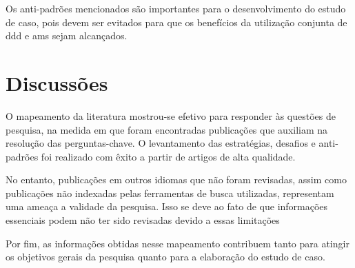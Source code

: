Os anti-padrões mencionados são importantes para o desenvolvimento do estudo de caso, pois devem ser evitados para que os benefícios da utilização conjunta de \acrshort{ddd} e \acrshort{ams} sejam alcançados.

\section{Discussões}
O mapeamento da literatura mostrou-se efetivo para responder às questões de pesquisa, na medida em que foram encontradas publicações que auxiliam na resolução das perguntas-chave. O levantamento das estratégias, desafios e anti-padrões foi realizado com êxito a partir de artigos de alta qualidade.

No entanto, publicações em outros idiomas que não foram revisadas, assim como publicações não indexadas pelas ferramentas de busca utilizadas, representam uma ameaça a validade da pesquisa. Isso se deve ao fato de que informações essenciais podem não ter sido revisadas devido a essas limitações

Por fim, as informações obtidas nesse mapeamento contribuem tanto para atingir os objetivos gerais da pesquisa quanto para a elaboração do estudo de caso.
